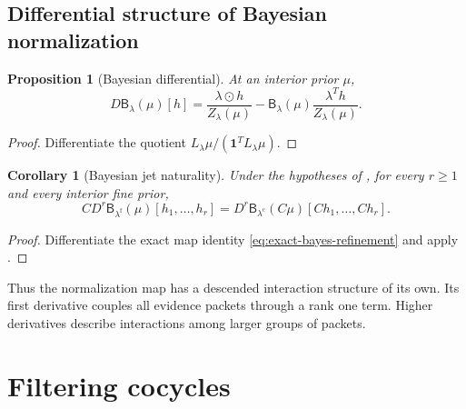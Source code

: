 \documentclass[11pt]{article}
\newtheorem{proposition}[theorem]{Proposition}
\newtheorem{corollary}[theorem]{Corollary}
\theoremstyle{definition}
\theoremstyle{remark}
\newcommand{\fine}{\mathrm f}
\newcommand{\coarse}{\mathrm c}
\newcommand{\Bup}{\mathsf B}
\newcommand{\one}{\mathbf 1}
\begin{document}
\subsection{Differential structure of Bayesian normalization}

\begin{proposition}[Bayesian differential]\label{prop:bayes-differential}
At an interior prior $\mu$,
\begin{equation}\label{eq:bayes-differential}
  D\Bup_{\lambda}(\mu)[h]
  =
  \frac{\lambda\odot h}{Z_{\lambda}(\mu)}
  -
  \Bup_{\lambda}(\mu)
  \frac{\lambda^Th}{Z_{\lambda}(\mu)}.
\end{equation}
\end{proposition}

\begin{proof}
Differentiate the quotient $L_{\lambda}\mu/(\one^TL_{\lambda}\mu)$.
\end{proof}

\begin{corollary}[Bayesian jet naturality]\label{cor:bayes-jet-naturality}
Under the hypotheses of , for every $r\geq1$ and every interior fine prior,
\begin{equation}\label{eq:bayes-jet-naturality}
  C D^r\Bup_{\lambda^{\fine}}(\mu)
  [h_1,\ldots,h_r]
  =
  D^r\Bup_{\lambda^{\coarse}}(C\mu)
  [Ch_1,\ldots,Ch_r].
\end{equation}
\end{corollary}

\begin{proof}
Differentiate the exact map identity \eqref{eq:exact-bayes-refinement} and apply .
\end{proof}

Thus the normalization map has a descended interaction structure of its own.  Its first derivative couples all evidence packets through a rank one term.  Higher derivatives describe interactions among larger groups of packets.

\section{Filtering cocycles}\label{sec:cocycles}
\end{document}
